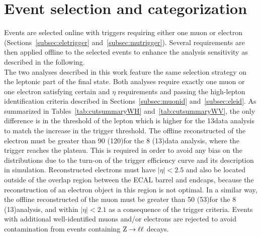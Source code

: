 \section{Event selection and categorization}\label{sec:finalselection}

Events are selected online with triggers requiring either one muon or electron (Sections~\ref{subsec:eletrigger} and~\ref{subsec:mutrigger}).
Several requirements are then applied offline to the selected events to enhance the analysis sensitivity as described in the following.\\

The two analyses described in this work feature the same selection strategy on the leptonic part of the final state.
Both analyses require exactly one muon or one electron satisfying certain \pt and $\eta$ requirements and passing 
the high-\pt lepton identification criteria described in Sections~\ref{subsec:muonid} and~\ref{subsec:eleid}.
As summarized in Tables~\ref{tab:cutsummaryWH} and~\ref{tab:cutsummaryWV}, the only difference is in the \pt threshold of the lepton which is higher for the 13\TeV data analysis
to match the increase in the trigger threshold. The offline reconstructed \pt of the electron must be greater than 90 (120)\GeV for the 8 (13)\TeV data analysis, where the trigger reaches the plateau.
This is required in order to avoid any bias on the distributions due to the turn-on of the trigger efficiency curve and its description in simulation.
Reconstructed electrons must have $|\eta| < 2.5$ and also be located outside of the overlap region between the ECAL barrel and endcaps, because the reconstruction of an electron object in
this region is not optimal. In a similar way, the offline reconstructed \pt of the muon must be greater than 50 (53)\GeV for the 8 (13)\TeV analysis, and within $|\eta| < 2.1$ as a consequence of the trigger criteria.
Events with additional well-identified muons and/or electrons are rejected to avoid contamination from events containing $\mathrm{Z}\to\ell\ell$ decays.\\

